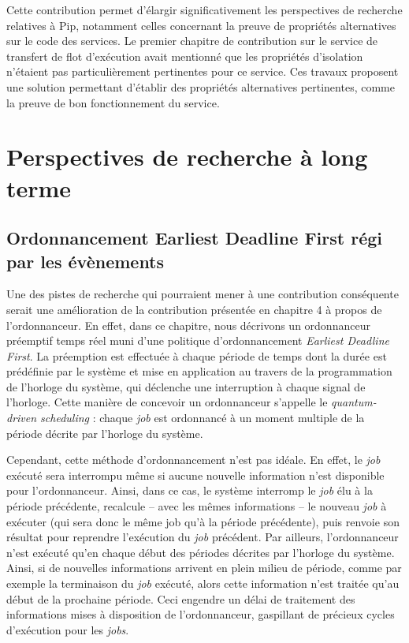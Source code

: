 		Cette contribution permet d'élargir significativement les perspectives de recherche relatives à Pip, notamment celles concernant la preuve de propriétés alternatives sur le code des services. Le premier chapitre de contribution sur le service de transfert de flot d'exécution avait mentionné que les propriétés d'isolation n'étaient pas particulièrement pertinentes pour ce service. Ces travaux proposent une solution permettant d'établir des propriétés alternatives pertinentes, comme la preuve de bon fonctionnement du service.


	\section{Perspectives de recherche à long terme}

		\subsection{Ordonnancement Earliest Deadline First régi par les évènements}

		Une des pistes de recherche qui pourraient mener à une contribution conséquente serait une amélioration de la contribution présentée en chapitre 4 à propos de l'ordonnanceur. En effet, dans ce chapitre, nous décrivons un ordonnanceur préemptif temps réel muni d'une politique d'ordonnancement \emph{Earliest Deadline First}. La préemption est effectuée à chaque période de temps dont la durée est prédéfinie par le système et mise en application au travers de la programmation de l'horloge du système, qui déclenche une interruption à chaque signal de l'horloge. Cette manière de concevoir un ordonnanceur s'appelle le \emph{quantum-driven scheduling} : chaque \emph{job} est ordonnancé à un moment multiple de la période décrite par l'horloge du système.

		Cependant, cette méthode d'ordonnancement n'est pas idéale. En effet, le \emph{job} exécuté sera interrompu même si aucune nouvelle information n'est disponible pour l'ordonnanceur. Ainsi, dans ce cas, le système interromp le \emph{job} élu à la période précédente, recalcule -- avec les mêmes informations -- le nouveau \emph{job} à exécuter (qui sera donc le même job qu'à la période précédente), puis renvoie son résultat pour reprendre l'exécution du \emph{job} précédent. Par ailleurs, l'ordonnanceur n'est exécuté qu'en chaque début des périodes décrites par l'horloge du système. Ainsi, si de nouvelles informations arrivent en plein milieu de période, comme par exemple la terminaison du \emph{job} exécuté, alors cette information n'est traitée qu'au début de la prochaine période. Ceci engendre un délai de traitement des informations mises à disposition de l'ordonnanceur, gaspillant de précieux cycles d'exécution pour les \emph{jobs}.

